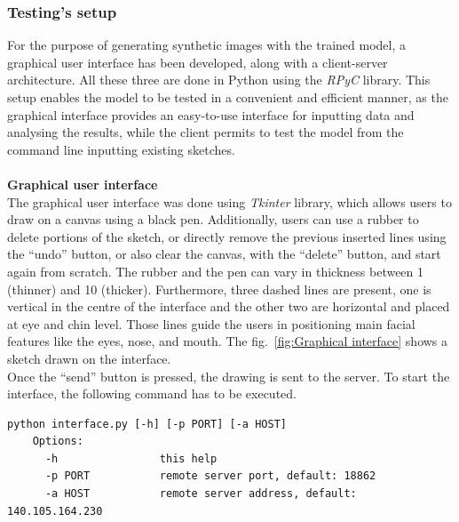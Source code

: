 \subsubsection{Testing's setup}
\label{sec:testing setup}
For the purpose of generating synthetic images with the trained model, a graphical user interface has been developed, along with a client-server architecture. All these three are done in Python using the \textit{RPyC} library. This setup enables the model to be tested in a convenient and efficient manner, as the graphical interface provides an easy-to-use interface for inputting data and analysing the results, while the client permits to test the model from the command line inputting existing sketches.\\ \\
%
\textbf{Graphical user interface}\\
The graphical user interface was done using \textit{Tkinter} library, which allows users to draw on a canvas using a black pen. Additionally, users can use a rubber to delete portions of the sketch, or directly remove the previous inserted lines using the “undo” button, or also clear the canvas, with the “delete” button, and start again from scratch. The rubber and the pen can vary in thickness between 1 (thinner) and 10 (thicker). Furthermore, three dashed lines are present, one is vertical in the centre of the interface and the other two are horizontal and placed at eye and chin level. Those lines guide the users in positioning main facial features like the eyes, nose, and mouth. The fig.~\ref{fig:Graphical interface} shows a sketch drawn on the interface.\\
Once the “send” button is pressed, the drawing is sent to the server.
To start the interface, the following command has to be executed.
\begin{lstlisting}[numbers=none]
    python interface.py [-h] [-p PORT] [-a HOST]
    Options:
      -h                this help
      -p PORT           remote server port, default: 18862
      -a HOST           remote server address, default: 140.105.164.230
\end{lstlisting} 
